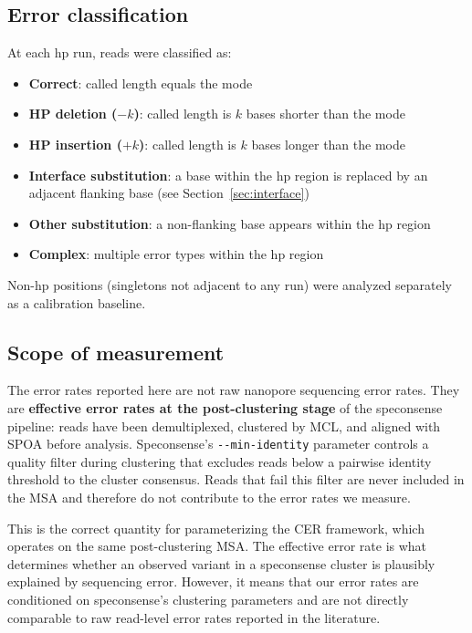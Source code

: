 \documentclass[11pt]{article}
\begin{document}
\subsection{Error classification}

At each hp run, reads were classified as:

\begin{itemize}
\item \textbf{Correct}: called length equals the mode
\item \textbf{HP deletion ($-k$)}: called length is $k$ bases shorter than the mode
\item \textbf{HP insertion ($+k$)}: called length is $k$ bases longer than the mode
\item \textbf{Interface substitution}: a base within the hp region is replaced
  by an adjacent flanking base (see Section~\ref{sec:interface})
\item \textbf{Other substitution}: a non-flanking base appears within the hp region
\item \textbf{Complex}: multiple error types within the hp region
\end{itemize}

Non-hp positions (singletons not adjacent to any run) were analyzed separately
as a calibration baseline.

\subsection{Scope of measurement}

The error rates reported here are not raw nanopore sequencing error rates.
They are \textbf{effective error rates at the post-clustering stage} of the
speconsense pipeline: reads have been demultiplexed, clustered by MCL, and
aligned with SPOA before analysis. Speconsense's \texttt{-{}-min-identity}
parameter controls a quality filter during clustering that excludes reads
below a pairwise identity threshold to the cluster consensus. Reads that fail
this filter are never included in the MSA and therefore do not contribute to
the error rates we measure.

This is the correct quantity for parameterizing the CER framework, which
operates on the same post-clustering MSA. The effective error rate is what
determines whether an observed variant in a speconsense cluster is plausibly
explained by sequencing error. However, it means that our error rates are
conditioned on speconsense's clustering parameters and are not directly
comparable to raw read-level error rates reported in the literature.
\end{document}
